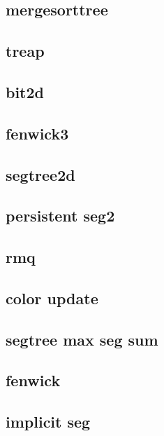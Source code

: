 \subsection{mergesorttree}
\raggedbottom
\hrulefill
\subsection{treap}
\raggedbottom
\hrulefill
\subsection{bit2d}
\raggedbottom
\hrulefill
\subsection{fenwick3}
\raggedbottom
\hrulefill
\subsection{segtree2d}
\raggedbottom
\hrulefill
\subsection{persistent seg2}
\raggedbottom
\hrulefill
\subsection{rmq}
\raggedbottom
\hrulefill
\subsection{color update}
\raggedbottom
\hrulefill
\subsection{segtree max seg sum}
\raggedbottom
\hrulefill
\subsection{fenwick}
\raggedbottom
\hrulefill
\subsection{implicit seg}
\raggedbottom
\hrulefill
